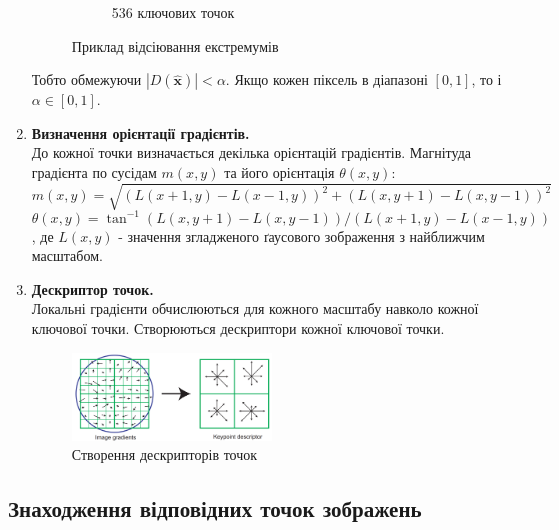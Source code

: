 \begin{enumerate}
\begin{figure}[H]
\begin{subfigure}[c]{0.3\textwidth}
                  \caption{ 536 ключових точок
                      \label{fig:swift5}
                  }
              \end{subfigure}
              \caption{Приклад відсіювання екстремумів \cite{sift}
                  \label{fig:sift45}
              }
          \end{figure}
          Тобто обмежуючи $|D(\widehat{\textbf{x}})| < \alpha$.
          Якщо кожен піксель в діапазоні $[0,1]$, то і
          $ \alpha \in [0,1]$.
    \item \textbf{Визначення орієнтації градієнтів.} \\
          До кожної точки визначається декілька орієнтацій градієнтів.
          Магнітуда градієнта по сусідам $m(x,y)$ та його орієнтація $\theta(x,y)$:
          \begin{equation*}
              m(x,y) = \sqrt{(L(x+1,y) - L(x-1,y))^2 + (L(x,y+1) - L(x,y-1))^2}
          \end{equation*}
          \begin{equation*}
              \theta(x,y) = \tan^{-1} (L(x,y+1) - L(x,y-1))/(L(x+1,y) - L(x-1,y))
          \end{equation*}
          , де $L(x,y)$ - значення згладженого ґаусового зображення з найближчим масштабом.

    \item \textbf{Дескриптор точок.} \\
          Локальні градієнти обчислюються для кожного масштабу навколо кожної ключової точки.
          Створюються дескриптори кожної ключової точки.
          \begin{figure}[H]
              \centering
              \includegraphics[width=0.5\textwidth]{images/sift6}
              \caption{Створення дескрипторів точок \cite{sift}
                  \label{fig:swift6}
              }
          \end{figure}
\end{enumerate}

\subsection{Знаходження відповідних точок зображень}

